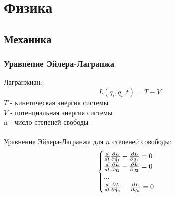 \section{Физика}
\subsection{Механика}
\subsubsection{Уравнение Эйлера-Лагранжа}
Лагранжиан:
$$L(q_{i},\dot q_{i},t)=T-V$$
$T$ - кинетическая энергия системы\\
$V$ - потенциальная энергия системы\\
n - число степеней свободы\\\\
Уравнение Эйлера-Лагранжа для $n$ степеней совободы:
\begin{equation*}
 \begin{cases}
   $$\frac{d}{dt}\frac{\partial L}{\partial \dot q_{1}}-\frac{\partial L}{\partial q_{1}} = 0$$\\
   $$\frac{d}{dt}\frac{\partial L}{\partial \dot q_{2}}-\frac{\partial L}{\partial q_{2}} = 0$$\\
   ...\\
   $$\frac{d}{dt}\frac{\partial L}{\partial \dot q_{n}}-\frac{\partial L}{\partial q_{n}} = 0$$
 \end{cases}
\end{equation*}

